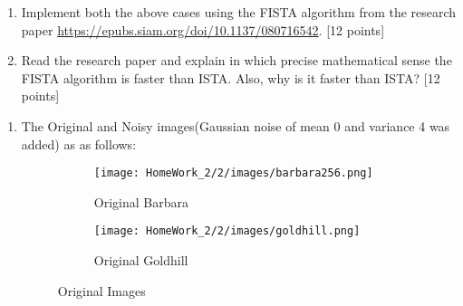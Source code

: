 \documentclass{article}
\begin{document}
\begin{enumerate}
\begin{enumerate}
\item Implement both the above cases using the FISTA algorithm from the research paper \url{https://epubs.siam.org/doi/10.1137/080716542}. \textsf{[12 points]}
\item Read the research paper and explain in which precise mathematical sense the FISTA algorithm is faster than ISTA. Also, why is it faster than ISTA? \textsf{[12 points]}
\end{enumerate}
\begin{enumerate}
    \item The Original and Noisy images(Gaussian noise of mean 0 and variance 4 was added) as as follows:
\FloatBarrier
\begin{figure}[!h]
    \centering
    \begin{subfigure}[b]{0.45\textwidth}
        \centering
        \texttt{[image: HomeWork\_2/2/images/barbara256.png]}
        \caption{Original Barbara}
    \end{subfigure}
    \begin{subfigure}[b]{0.45\textwidth}
        \centering
        \texttt{[image: HomeWork\_2/2/images/goldhill.png]}
        \caption{Original Goldhill}
    \end{subfigure}
    \caption{Original Images}
\end{figure}


\end{enumerate}
\end{enumerate}
\end{document}
